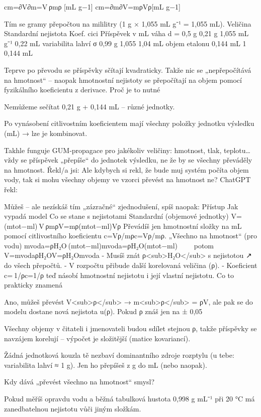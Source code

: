 {cm=∂V∂m=V ⁣ρmρ  [mL g−1]
cm​=∂m∂V​=mρ​Vρ​​[mL g−1]

Tím se gramy přepočtou na mililitry (1 g × 1,055 mL g⁻¹ = 1,055 mL).
Veličina	Standardní nejistota	Koef. cici​	Příspěvek v mL
váha d = 0,5 g	0,21 g	1,055 mL g⁻¹	0,22 mL
variabilita lahví σ	0,99 g	1,055	1,04 mL
objem etalonu	0,144 mL	1	0,144 mL

Teprve po převodu se příspěvky sčítají kvadraticky.
Takže nic se „nepřepočítává na hmotnost“ – naopak hmotnostní nejistoty se přepočítají na objem pomocí fyzikálního koeficientu z derivace.
Proč je to nutné

    Nemůžeme sečítat 0,21 g + 0,144 mL – různé jednotky.

    Po vynásobení citlivostním koeficientem mají všechny položky jednotku výsledku (mL) → lze je kombinovat.

Takhle funguje GUM‑propagace pro jakékoliv veličiny: hmotnost, tlak, teplotu… vždy se příspěvek „přepíše“ do jednotek výsledku, ne že by se všechny převáděly na hmotnost.
Řekl/a jsi:
Ale kdybych si rekl, že bude muj systém počíta objem vody, tak si mohu všechny objemy ve vzorci převést na hmotnost ne?
ChatGPT řekl:

Můžeš – ale nezískáš tím „zázračné“ zjednodušení, spíš naopak:
Přístup	Jak vypadá model	Co se stane s nejistotami
Standardní (objemové jednotky)	V=(mtot−ml) V ⁣ρmρV=mρ​(mtot​−ml​)Vρ​​	Převádíš jen hmotnostní složky na mL pomocí citlivostního koeficientu c=Vρ/mρc=Vρ​/mρ​.
„Všechno na hmotnost“ (pro vodu)	mvoda=ρH₂O (mtot−ml)mvoda​=ρH₂O​(mtot​−ml​)    potom V=mvodaρH₂OV=ρH₂O​mvoda​​	- Musíš znát ρ<sub>H₂O</sub> s nejistotou ↗ do všech přepočtů.
- V rozpočtu přibude další korelovaná veličina (ρ).
- Koeficient c= ⁣1/ρc=1/ρ teď násobí hmotnostní nejistotu i její vlastní nejistotu.
Co to prakticky znamená

    Ano, můžeš převést V<sub>ρ</sub> → m<sub>ρ</sub> = ρV, ale
    pak se do modelu dostane nová nejistota u(ρ). Pokud ρ znáš jen na ± 0,05  %

    Všechny objemy v čitateli i jmenovateli budou sdílet stejnou ρ, takže příspěvky se navzájem korelují – výpočet je složitější (matice kovariancí).

    Žádná jednotková kouzla tě nezbaví dominantního zdroje rozptylu (u tebe: variabilita lahví ≈ 1 g). Jen ho přepíšeš z g do mL (nebo naopak).

Kdy dává „převést všechno na hmotnost“ smysl?

    Pokud měříš opravdu vodu a běžná tabulková hustota 0,998 g mL⁻¹ při 20 °C má zanedbatelnou nejistotu vůči jiným složkám.

}
